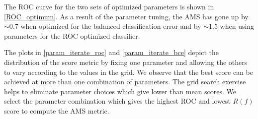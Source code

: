 \documentclass[final,3p,times,twocolumn]{elsarticle}
\begin{document}
The ROC curve for the two sets of optimized parameters is shown in \ref{ROC_optimum}. As a result of the parameter tuning, the AMS has gone up by $\sim$0.7 when optimized for the balanced classification error and by $\sim$1.5 when using parameters for the ROC optimized classifier.  


The plots in \ref{param_iterate_roc} and \ref{param_iterate_bce} depict the distribution of the score metric by fixing one parameter and allowing the others to vary according to the values in the grid. We observe that the best score can be achieved at more than one combination of parameters. The grid search exercise helps to eliminate parameter choices which give lower than mean scores. We select the parameter combination which gives the highest ROC and lowest $R(f)$ score to compute the AMS metric. 
\end{document}

